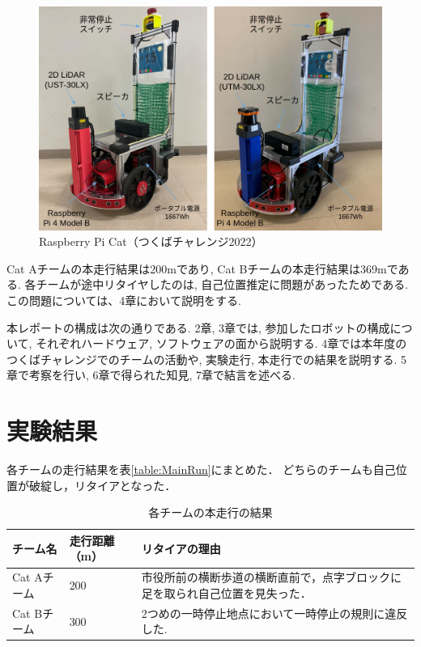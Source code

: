 \documentclass[twocolumn,9pt]{jsproceedings}
\begin{document}
\begin{figure}[h]
 	\begin{center}
 		\includegraphics[width=1.0\linewidth]{figs/raspicat.png}
 		\caption{Raspberry Pi Cat（つくばチャレンジ2022）}
 		\label{fig:raspicat}
 	\end{center}
\end{figure}

Cat Aチームの本走行結果は200mであり,  
Cat Bチームの本走行結果は369mである. 
各チームが途中リタイヤしたのは, 自己位置推定に問題があったためである. 
この問題については、4章において説明をする. 






本レポートの構成は次の通りである. 
2章, 3章では, 参加したロボットの構成について, 
それぞれハードウェア, ソフトウェアの面から説明する. 
4章では本年度のつくばチャレンジでのチームの活動や, 
実験走行, 本走行での結果を説明する.
5章で考察を行い, 6章で得られた知見, 7章で結言を述べる. 

\section{実験結果}

各チームの走行結果を表\ref{table:MainRun}にまとめた．
どちらのチームも自己位置が破綻し，リタイアとなった．

\begin{table}[h]
  \label{MainRun}
  \begin{tabular}{|l|l|l|}
    \hline
    チーム名 & 走行距離（m） & リタイアの理由 \\
    \hline
    Cat Aチーム & 200 & 市役所前の横断歩道の横断直前で，点字ブロックに足を取られ自己位置を見失った．\\
    \hline
    Cat Bチーム & 300 & 2つめの一時停止地点において一時停止の規則に違反した. \\ 
    \hline
  \end{tabular}
  \caption{各チームの本走行の結果}
\end{table}
\end{document}

